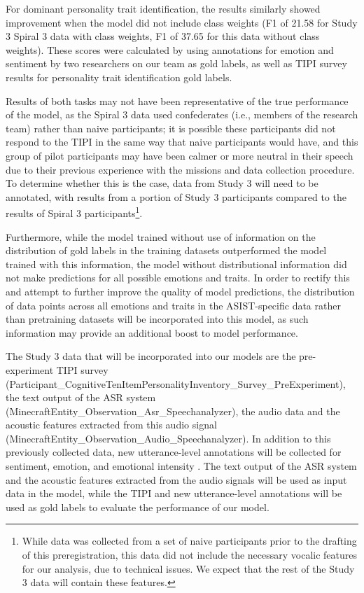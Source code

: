 For dominant personality trait identification, the results similarly showed
improvement when the model did not include class weights (F1 of 21.58 for Study
3 Spiral 3 data with class weights, F1 of 37.65 for this data without class
weights). These scores were calculated by using annotations for emotion and
sentiment  by two researchers on
our team as gold labels, as well as TIPI  survey results for
personality trait identification gold labels. 

Results of both tasks may not have been representative of the true performance
of the model, as the Spiral 3 data used confederates (i.e., members of the
research team) rather than naive participants; it is possible these
participants did not respond to the TIPI in the same way that naive
participants would have, and this group of pilot participants may have been
calmer or more neutral in their speech due to their previous experience with
the missions and data collection procedure. To determine whether this is the
case, data from Study 3 will need to be annotated, with results from a portion
of Study 3 participants compared to the results of Spiral 3
participants\footnote{While data was collected from a set of naive participants
prior to the drafting of this preregistration, this data did not include the
necessary vocalic features for our analysis, due to technical issues. We expect
that the rest of the Study 3 data will contain these features.}.

Furthermore, while the model trained without use of information on the distribution
of gold labels in the training datasets outperformed the model trained with this
information, the model without distributional information did not make predictions
for all possible emotions and traits. In order to rectify this and attempt to
further improve the quality of model predictions, the distribution of data points
across all emotions and traits in the ASIST-specific data rather than pretraining
datasets will be incorporated into this model, as such information may provide an
additional boost to model performance.

The Study 3 data that will be incorporated into our models are the
pre-experiment TIPI survey
(Participant\_CognitiveTenItemPersonalityInventory\_Survey\_PreExperiment), the
text output of the ASR system
(MinecraftEntity\_Observation\_Asr\_Speechanalyzer), the audio data and the
acoustic features extracted from this audio signal
(MinecraftEntity\_Observation\_Audio\_Speechanalyzer). In addition to this previously collected data, new
utterance-level annotations will be collected for sentiment, emotion, and
emotional intensity . The text output of the ASR system and the acoustic features extracted
from the audio signals will be used as input data in the model, while the TIPI
and new utterance-level annotations will be used as gold labels to evaluate the
performance of our model. 

